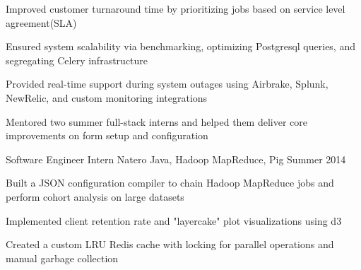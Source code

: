 \begin{cventries}
{\begin{cvitems}
        \item {Improved customer turnaround time by prioritizing jobs based on service level agreement(SLA)}
        \item {Ensured system scalability via benchmarking, optimizing Postgresql queries, and segregating Celery infrastructure}
        \item {Provided real-time support during system outages using Airbrake, Splunk, NewRelic, and custom monitoring integrations}
        \item {Mentored two summer full-stack interns and helped them deliver core improvements on form setup and configuration}
      \end{cvitems}
    }
  \cventry
    {Software Engineer Intern}
    {Natero}
    {Java, Hadoop MapReduce, Pig}
    {Summer 2014}
    {
      \begin{cvitems}
        \item {Built a JSON configuration compiler to chain Hadoop MapReduce jobs and perform cohort analysis on large datasets}
        \item {Implemented client retention rate and "layercake" plot visualizations using d3}
        \item {Created a custom LRU Redis cache with locking for parallel operations and manual garbage collection}
      \end{cvitems}
    }
\end{cventries}
